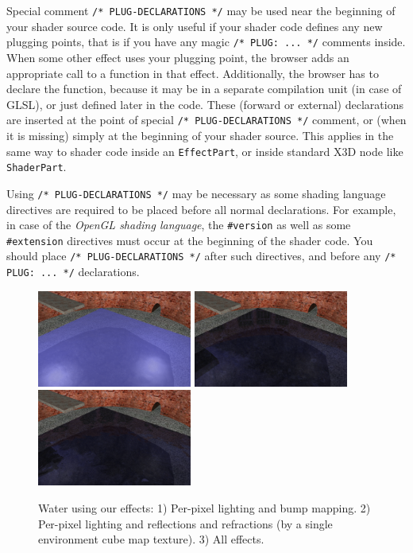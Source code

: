 \documentclass{egpubl}
\begin{document}
Special comment \texttt{/* PLUG-DECLARATIONS */} may be used
near the beginning of your shader source code. It is only useful
if your shader code defines any new plugging points, that is if you
have any magic \texttt{/* PLUG: ... */} comments inside.
When some other effect uses your plugging point, the browser adds
an appropriate call to a function in that effect.
Additionally, the browser has to declare the function,
because it may be in a separate compilation unit (in case of GLSL),
or just defined later in the code.
These (forward or external) declarations are inserted at
the point of special \texttt{/* PLUG-DECLARATIONS */}
comment, or (when it is missing) simply at the beginning of your shader source.
This applies in the same way to shader code inside an \texttt{EffectPart},
or inside standard X3D node like \texttt{ShaderPart}.

Using \texttt{/* PLUG-DECLARATIONS */} may be necessary
as some shading language directives are required to be placed before
all normal declarations. For example, in case of the \emph{OpenGL shading language},
the \texttt{\#version} as well as some \texttt{\#extension} directives
must occur at the beginning of the shader code. You should place
\texttt{/* PLUG-DECLARATIONS */} after such directives,
and before any \texttt{/* PLUG: ... */} declarations.

\setcounter{figure}{8}
\begin{figure}[t]
  \centering
  \includegraphics[width=2.0in]{water_shaders_1}
  \includegraphics[width=2.0in]{water_shaders_2}
  \includegraphics[width=2.0in]{water_shaders_3}
  \caption{Water using our effects: 1) Per-pixel lighting and bump mapping.
2) Per-pixel lighting and reflections and refractions (by a single environment cube map texture).
3) All effects.}
  \label{fig_water}
\end{figure}
\setcounter{figure}{6}
\end{document}
